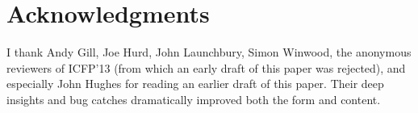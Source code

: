 \documentclass{sigplanconf}
\begin{document}


\section*{Acknowledgments}
I thank Andy Gill, Joe Hurd, John Launchbury, Simon Winwood, the anonymous
reviewers of ICFP'13 (from which an early draft of this paper was rejected), and
especially John Hughes for reading an earlier draft of this paper.  Their deep
insights and bug catches dramatically improved both the form and content.




\balancecolumns
\end{document}
